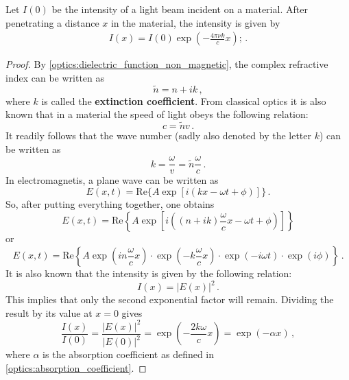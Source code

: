     \begin{theorem}\label{optics:lambert_beer}
        Let $I(0)$ be the intensity of a light beam incident on a material. After penetrating a distance $x$ in the material, the intensity is given by
        \begin{gather}
            I(x) = I(0)\exp\left(-\frac{4\pi\nu k}{c}x\right);\,.
        \end{gather}
        \begin{mdframed}[roundcorner=10pt, linecolor=blue, linewidth=1pt]
            \begin{proof}
                By \cref{optics:dielectric_function_non_magnetic}, the complex refractive index can be written as \[\widetilde{n} = n+ik\,,\] where $k$ is called the \textbf{extinction coefficient}. From classical optics it is also known that in a material the speed of light obeys the following relation: \[c = \widetilde{n}v\,.\] It readily follows that the wave number (sadly also denoted by the letter $k$) can be written as \[k = \frac{\omega}{v} = \widetilde{n}\frac{\omega}{c}\,.\] In electromagnetis, a plane wave can be written as \[E(x,t) = \mathrm{Re}\bigl\{A\exp\left[i(kx - \omega t + \phi)\right]\bigr\}\,.\] So, after putting everything together, one obtains \[E(x,t) = \mathrm{Re}\left\{A\exp\left[i\left((n+ik)\frac{\omega}{c}x - \omega t + \phi\right)\right]\right\}\] or \[E(x,t) = \mathrm{Re}\left\{A\exp\left(in\frac{\omega}{c}x\right)\cdot\exp\left(-k\frac{\omega}{c}x\right)\cdot\exp\left(-i\omega t\right)\cdot\exp\left(i\phi\right)\right\}\,.\] It is also known that the intensity is given by the following relation:\[I(x) = |E(x)|^2\,.\] This implies that only the second exponential factor will remain. Dividing the result by its value at $x=0$ gives \[\frac{I(x)}{I(0)} = \frac{|E(x)|^2}{|E(0)|^2} = \exp\left(-\frac{2k\omega}{c}x\right) = \exp(-\alpha x)\,,\]
                where $\alpha$ is the absorption coefficient as defined in \cref{optics:absorption_coefficient}.
            \end{proof}
        \end{mdframed}
    \end{theorem}


